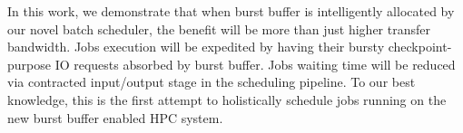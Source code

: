 In this work, we demonstrate that when burst buffer is intelligently allocated 
by our novel batch scheduler,
the benefit will be more than just higher transfer bandwidth.
Jobs execution will be expedited by having their bursty checkpoint-purpose IO requests 
absorbed by burst buffer.
Jobs waiting time will be reduced via
contracted input/output stage in the scheduling pipeline.
To our best knowledge, this is the first attempt to holistically 
schedule jobs running on the new burst buffer enabled HPC system.







